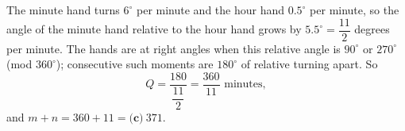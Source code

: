 The minute hand turns $6^\circ$ per minute and the hour hand $0.5^\circ$ per minute, so the angle of the minute hand relative to the hour hand grows by $5.5^\circ=\dfrac{11}{2}$ degrees per minute. The hands are at right angles when this relative angle is $90^\circ$ or $270^\circ$ (mod $360^\circ$); consecutive such moments are $180^\circ$ of relative turning apart. So
\[
Q=\dfrac{180}{\dfrac{11}{2}}=\dfrac{360}{11}\text{ minutes},
\]
and $m+n=360+11=\boxed{\textbf{(c)}\ 371}$.
